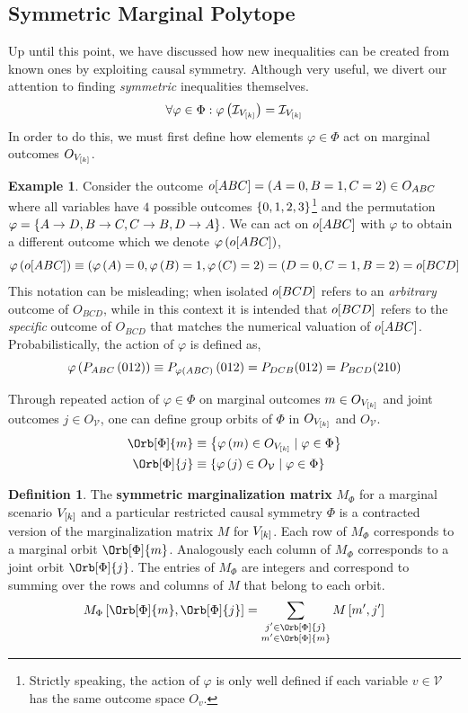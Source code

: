 \documentclass[aps, 10pt, english, twoside, pra, nofootinbib, longbibliography]{revtex4-1}
\theoremstyle{plain}
\theoremstyle{definition}
\newtheorem{definition}[theorem]{Definition}
\newtheorem{example}[theorem]{Example}
\theoremstyle{remark}
\newcommand{\term}[1]{\textcolor{Mahogany}{\textbf{#1}}}
\newcommand{\outc}[1]{o\!\bs{#1}} %
\begin{document}
    \subsection{Symmetric Marginal Polytope}
    Up until this point, we have discussed how new inequalities can be created from known ones by exploiting causal symmetry. Although very useful, we divert our attention to finding \textit{symmetric} inequalities themselves.
    \[ \forall \varphi \in \Phi :  \varphi\left( \mathcal{I}_{V_{\left[ k \right]}} \right) = \mathcal{I}_{V_{\left[ k \right]}} \]
    In order to do this, we must first define how elements $\varphi \in \Phi$ act on marginal outcomes $O_{V_{\left[ k \right]}}$.
    \begin{example}
        Consider the outcome $\outc{ABC} = \br{A = 0, B = 1, C = 2} \in O_{ABC}$ where all variables have $4$ possible outcomes $\left\{ 0,1,2,3 \right\}$\footnote{Strictly speaking, the action of $\varphi$ is only well defined if each variable $v \in \mathcal{V}$ has the same outcome space $O_v$.} and the permutation $\varphi = \left\{ A \to D, B \to C, C \to B, D \to A \right\}$. We can act on $\outc{ABC}$ with $\varphi$ to obtain a different outcome which we denote $\varphi\br{\outc{ABC}}$,
        \[ \varphi\br{\outc{ABC}} \defined \br{\varphi\br{A} = 0, \varphi\br{B} = 1, \varphi\br{C} = 2} = \br{D = 0, C = 1, B = 2} = \outc{BCD} \]
        This notation can be misleading; when isolated $\outc{BCD}$ refers to an \textit{arbitrary} outcome of $O_{BCD}$, while in this context it is intended that $\outc{BCD}$ refers to the \textit{specific} outcome of $O_{BCD}$ that matches the numerical valuation of $\outc{ABC}$. Probabilistically, the action of $\varphi$ is defined as,
        \[ \varphi\br{\prob[ABC]\br{012}} \defined \prob[\varphi\br{ABC}]\br{012} = \prob[DCB][012] = \prob[BCD][210] \]
    \end{example}

    Through repeated action of $\varphi \in \Phi$ on marginal outcomes $m \in O_{V_{\left[ k \right]}}$ and joint outcomes $j \in O_{\mathcal{V}}$, one can define group orbits of $\Phi$ in $O_{V_{\left[ k \right]}}$ and $O_{\mathcal{V}}$.
    \begin{align*}
    \Orb[\Phi]{m} &\defined \bc{\varphi\br{m} \in O_{V_{\bs{k}}} \mid \varphi \in \Phi} \\
    \Orb[\Phi]{j} &\defined \bc{\varphi\br{j} \in O_{\mathcal{V}} \mid \varphi \in \Phi}
    \end{align*}

    \begin{definition}
        The \term{symmetric marginalization matrix} $M_{\Phi}$ for a marginal scenario $V_{\left[ k \right]}$ and a particular restricted causal symmetry $\Phi$ is a contracted version of the marginalization matrix $M$ for $V_{\left[ k \right]}$. Each row of $M_{\Phi}$ corresponds to a marginal orbit $\Orb[\Phi]{m}$. Analogously each column of $M_{\Phi}$ corresponds to a joint orbit $\Orb[\Phi]{j}$. The entries of $M_{\Phi}$ are integers and correspond to summing over the rows and columns of $M$ that belong to each orbit.
        \[ M_{\Phi}\bs{\Orb[\Phi]{m}, \Orb[\Phi]{j}} = \sum_{\substack{j' \in \Orb[\Phi]{j} \\ m' \in \Orb[\Phi]{m}}} M\bs{m',j'} \]
    \end{definition}
\end{document}
